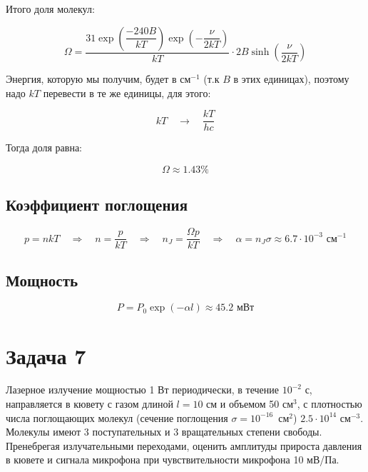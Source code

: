 \documentclass[a4paper, 12pt]{article}
\newcommand{\qrq}
{\ensuremath{\quad \Rightarrow \quad}} %
\begin{document}
Итого доля молекул:

\begin{equation}
	\Omega = \frac{31 \exp\left(\dfrac{-240 B}{kT}\right) \exp\left(-\dfrac{\nu}{2 k T}\right)}{kT} \cdot 2 B \sinh\left(\frac{\nu}{2 k T}\right)
\end{equation}

Энергия, которую мы получим, будет в см$^{-1}$ (т.к $B$ в этих единицах), поэтому надо $kT$ перевести в те же единицы, для этого:

\begin{equation}
	kT \quad   \longrightarrow \quad \frac{kT}{hc}
\end{equation}

Тогда доля равна:

\begin{equation}
	\Omega \approx 1.43 \%
\end{equation}

\subsection*{Коэффициент поглощения}

\begin{equation}
	p = nkT \qrq n = \frac{p}{kT} \qrq n_J =  \frac{\Omega p}{kT} \qrq \alpha = n_J \sigma \approx 6.7 \cdot 10^{-3} \text{ см}^{-1}
\end{equation}

\subsection*{Мощность}

\begin{equation}
	P = P_0 \exp\left(-\alpha l\right) \approx 45.2 \text{ мВт}
\end{equation}

\section*{Задача 7}

Лазерное излучение мощностью 1 Вт периодически, в течение $10^{-2}$ с, направляется в кювету с газом длиной $l = 10$ см и объемом 50 см$^3$, с плотностью числа поглощающих молекул (сечение поглощения $\sigma = 10^{-16}$~см$^2$) $2.5\cdot 10^{14}$ см$^{-3}$. Молекулы имеют 3 поступательных и 3 вращательных степени свободы. Пренебрегая излучательными переходами, оценить амплитуды прироста давления в кювете и сигнала микрофона при чувствительности микрофона 10 мВ/Па.
\end{document}
